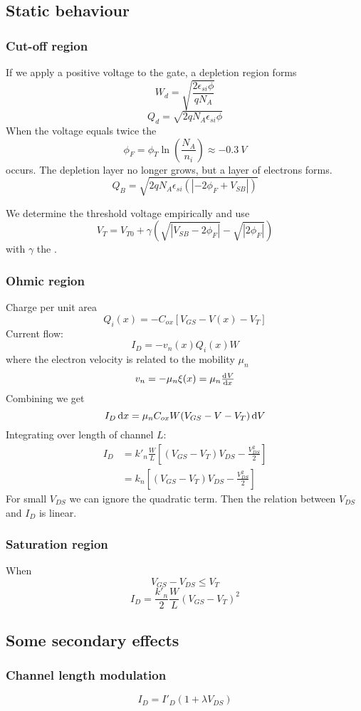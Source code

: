 \documentclass{report}
\begin{document}
\subsection{Static behaviour}
\subsubsection{Cut-off region}
If we apply a positive voltage to the gate, a depletion region forms
\[ W_d = \sqrt{\frac{2\epsilon_{si}\phi}{qN_A}} \]
\[ Q_d = \sqrt{2qN_A\epsilon_{si}\phi} \]
When the voltage equals twice the 
\[ \phi_F = \phi_T \ln \left(\frac{N_A}{n_i}\right) \approx -\SI{0.3}{V} \]
 occurs. The depletion layer no longer grows, but a layer of electrons forms.
\[ Q_B = \sqrt{2qN_A\epsilon_{si}(|-2\phi_F + V_{SB}|)} \]

We determine the threshold voltage empirically and use
\[ V_T = V_{T0} + \gamma(\sqrt{|V_{SB} - 2\phi_F|}-\sqrt{|2\phi_F|}) \]
with $\gamma$ the .

\subsubsection{Ohmic region}
Charge per unit area
\[ Q_i(x) = -C_{ox}[V_{GS}-V(x) - V_T] \]
Current flow:
\[ I_D = -v_n(x)Q_i(x)W \]
where the electron velocity is related to the mobility $\mu_n$
\[ v_n = -\mu_n \xi(x) = \mu_n \od{V}{x} \]
Combining we get
\[ I_D \operatorname{d \!}{x} = \mu_nC_{ox}W(V_{GS}-V-V_T)\operatorname{d \!}{V} \]
Integrating over length of channel $L$:
\begin{align*}
I_D &= k'_n \frac{W}{L}\left[(V_{GS}-V_T)V_{DS} - \frac{V_{DS}^2}{2}\right] \\
&= k_n\left[(V_{GS}-V_T)V_{DS} - \frac{V_{DS}^2}{2}\right]
\end{align*}
For small $V_{DS}$ we can ignore the quadratic term. Then the relation between $V_{DS}$ and $I_D$ is linear.

\subsubsection{Saturation region}
When
\[ V_{GS} - V_{DS} \leq V_T \]
\[ I_D = \frac{k'_n}{2}\frac{W}{L}(V_{GS}-V_T)^2 \]

\subsection{Some secondary effects}
\subsubsection{Channel length modulation}
\[ I_D = I'_D(1+\lambda V_{DS}) \]
\end{document}
